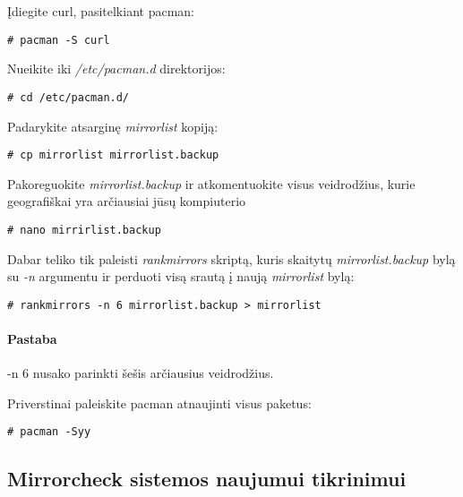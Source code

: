         Įdiegite curl, pasitelkiant pacman:

        \begin{verbatim}
# pacman -S curl
        \end{verbatim}

        Nueikite iki \textsl{/etc/pacman.d} direktorijos:

        \begin{verbatim}
# cd /etc/pacman.d/
        \end{verbatim}

        Padarykite atsarginę \textsl{mirrorlist} kopiją:

        \begin{verbatim}
# cp mirrorlist mirrorlist.backup
        \end{verbatim}

        Pakoreguokite \textsl{mirrorlist.backup} ir atkomentuokite
        visus veidrodžius, kurie geografiškai yra arčiausiai jūsų
        kompiuterio

        \begin{verbatim}
# nano mirrirlist.backup
        \end{verbatim}

        Dabar teliko tik paleisti \textsl{rankmirrors} skriptą, kuris
        skaitytų \textsl{mirrorlist.backup} bylą su \textsl{-n}
        argumentu ir perduoti visą srautą į naują \textsl{mirrorlist}
        bylą:

        \begin{verbatim}
# rankmirrors -n 6 mirrorlist.backup > mirrorlist
        \end{verbatim}

        \paragraph{Pastaba} -n 6 nusako parinkti šešis arčiausius
        veidrodžius.

        Priverstinai paleiskite pacman atnaujinti visus paketus:

        \begin{verbatim}
# pacman -Syy
        \end{verbatim}

    \subsection{Mirrorcheck sistemos naujumui tikrinimui}

    
